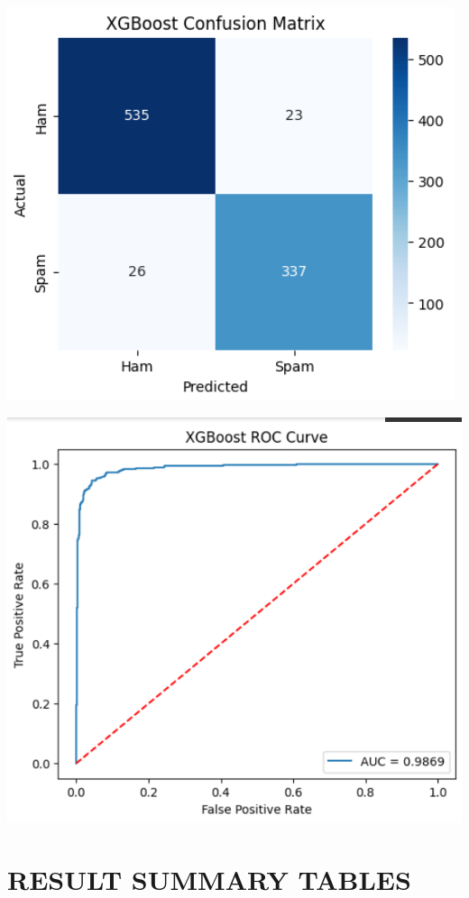 \documentclass[12pt]{article}
\begin{document}
\begin{minipage}{0.45\textwidth}
\centering
\includegraphics[width=\linewidth]{34.png}
\end{minipage}
\hfill
\begin{minipage}{0.45\textwidth}
\centering
\includegraphics[width=\linewidth]{35.png}
\end{minipage}

\section*{RESULT SUMMARY TABLES}
\end{document}
